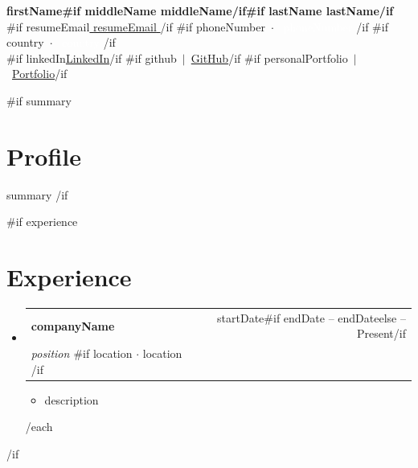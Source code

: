 \documentclass[10pt,a4paper]{article}
\newcommand{\resumeItem}[1]{\item\small{#1}}
\newcommand{\link}[2]{\href{#1}{#2}}
\begin{document}
\colorbox{headerBg}{%
  \parbox{\dimexpr\linewidth-2\fboxsep}{%
    \centering\vspace{8pt}
    {\color{white}\huge\bfseries
      {{firstName}}{{#if middleName}} {{middleName}}{{/if}}{{#if lastName}} {{lastName}}{{/if}}
    }\\[4pt]
    {\color{accent}\small
      {{#if resumeEmail}}\link{mailto:{{resumeEmail}} }{ {{resumeEmail}} }{{/if}}%
      {{#if phoneNumber}}\ $\cdot$\ \textcolor{white}{ {{phoneNumber}} }{{/if}}%
      {{#if country}}\ $\cdot$\ \textcolor{white}{ {{country}} }{{/if}}%
    }\\[3pt]
    {\color{white}\small
      {{#if linkedIn}}\link{ {{linkedIn}} }{LinkedIn}{{/if}}%
      {{#if github}}\ $|$\ \link{ {{github}} }{GitHub}{{/if}}%
      {{#if personalPortfolio}}\ $|$\ \link{ {{personalPortfolio}} }{Portfolio}{{/if}}%
    }
    \vspace{8pt}
  }%
}

{{#if summary}}
\section{Profile}
\small{}{{summary}}
{{/if}}

{{#if experience}}
\section{Experience}
\begin{itemize}[leftmargin=0pt, label={}, topsep=0pt, itemsep=6pt]
{{#each experience}}
  \item
    \begin{tabularx}{\linewidth}{@{}Xr@{}}
      \textbf{ {{companyName}} } & \textcolor{muted}{\small{}{{startDate}}{{#if endDate}} -- {{endDate}}{{else}} -- Present{{/if}} }\\
      \textit{\textcolor{accent}{ {{position}} } }{{#if location}} $\cdot$ \textcolor{muted}{\small{}{{location}} }{{/if}} & \\
    \end{tabularx}
    \begin{itemize}[leftmargin=12pt, topsep=2pt, itemsep=1pt]
      \resumeItem{\small{}{{description}} }
    \end{itemize}
{{/each}}
\end{itemize}
{{/if}}
\end{document}
